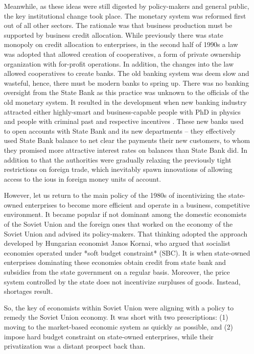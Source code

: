Meanwhile, as these ideas were still digested by policy-makers and
general public, the key institutional change took place. The monetary
system was reformed first out of all other sectors. The rationale was
that business production must be supported by business credit
allocation. While previously there was state monopoly on credit
allocation to enterprises, in the second half of 1990s a law was adopted
that allowed creation of cooperatives, a form of private ownership
organization with for-profit operations. In addition, the changes into
the law allowed cooperatives to create banks. The old banking system was
deem slow and wasteful, hence, there must be modern banks to spring up.
There was no banking oversight from the State Bank as this practice was
unknown to the officials of the old monetary system. It resulted in the
development when new banking industry attracted either highly-smart and
business-capable people with PhD in physics and people with criminal
past and respective incentives \citep{valchyshen_ru98}. These new banks used
to open accounts with State Bank and its new departments -- they
effectively used State Bank balance to net clear the payments their new
customers, to whom they promised more attractive interest rates on
balances than State Bank did. In addition to that the authorities were
gradually relaxing the previously tight restrictions on foreign trade,
which inevitably spawn innovations of allowing access to the \acp{iou} in
foreign money units of account.

However, let us return to the main policy of the 1980s of incentivizing
the state-owned enterprises to become more efficient and operate in a
business, competitive environment. It became popular if not dominant
among the domestic economists of the Soviet Union and the foreign ones
that worked on the economy of the Soviet Union and advised its
policy-makers. That thinking adopted the approach developed by Hungarian
economist Janos Kornai, who argued that socialist economies operated
under *soft budget constraint* (SBC). It is when state-owned enterprises
dominating these economies obtain credit from state bank and subsidies
from the state government on a regular basis. Moreover, the price system
controlled by the state does not incentivize surpluses of goods.
Instead, shortages result.

So, the key of economists within Soviet Union were aligning with a
policy to remedy the Soviet Union economy. It was short with two
prescriptions: (1) moving to the market-based economic system as quickly
as possible, and (2) impose hard budget constraint on state-owned
enterprises, while their privatization was a distant prospect back than.

